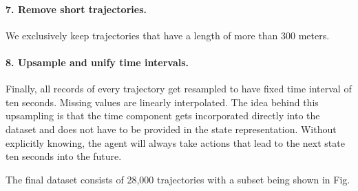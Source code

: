 \paragraph{7. Remove short trajectories.}
We exclusively keep trajectories that have a length of more than 300 meters.

\paragraph{8. Upsample and unify time intervals.}
Finally, all records of every trajectory get resampled to have fixed time interval of ten seconds. Missing values are linearly interpolated. The idea behind this upsampling is that the time component gets incorporated directly into the dataset and does not have to be provided in the state representation. Without explicitly knowing, the agent will always take actions that lead to the next state ten seconds into the future.
\par


The final dataset consists of 28,000 trajectories with a subset being shown in Fig. %